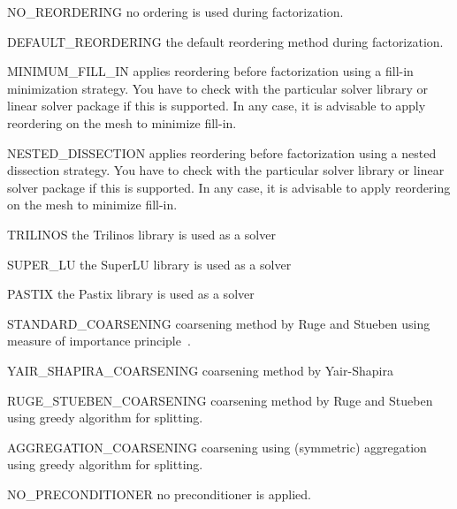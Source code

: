 \begin{memberdesc}[SolverOptions]{NO_REORDERING}
no ordering is used during factorization.
\end{memberdesc}

\begin{memberdesc}[SolverOptions]{DEFAULT_REORDERING}
the default reordering method during factorization.
\end{memberdesc}

\begin{memberdesc}[SolverOptions]{MINIMUM_FILL_IN}
applies reordering before factorization using a fill-in minimization strategy. You have to check with the particular solver library or
linear solver package if this is supported. In any case, it is advisable to apply reordering on the mesh to minimize fill-in.
\end{memberdesc}

\begin{memberdesc}[SolverOptions]{NESTED_DISSECTION}
applies reordering before factorization using a nested dissection strategy. You have to check with the particular solver library or
linear solver package if this is supported. In any case, it is advisable to apply reordering on the mesh to minimize fill-in.
\end{memberdesc}

\begin{memberdesc}[SolverOptions]{TRILINOS}
the Trilinos library is used as a solver~
\end{memberdesc}

\begin{memberdesc}[SolverOptions]{SUPER_LU}
the SuperLU library is used as a solver~
\end{memberdesc}

\begin{memberdesc}[SolverOptions]{PASTIX}
the Pastix library is used as a solver~
\end{memberdesc}


\begin{memberdesc}[SolverOptions]{STANDARD_COARSENING}
\AMG coarsening method by  Ruge and Stueben using measure of importance principle~\cite{Multigrid}. 
\end{memberdesc}

\begin{memberdesc}[SolverOptions]{YAIR_SHAPIRA_COARSENING}
\AMG coarsening method by Yair-Shapira
\end{memberdesc}

\begin{memberdesc}[SolverOptions]{RUGE_STUEBEN_COARSENING} \AMG coarsening method by Ruge and Stueben using greedy algorithm for splitting.
\end{memberdesc}

\begin{memberdesc}[SolverOptions]{AGGREGATION_COARSENING} \AMG coarsening using (symmetric) aggregation using greedy algorithm for splitting. 
\end{memberdesc}

\begin{memberdesc}[SolverOptions]{NO_PRECONDITIONER}
no preconditioner is applied.
\end{memberdesc}

